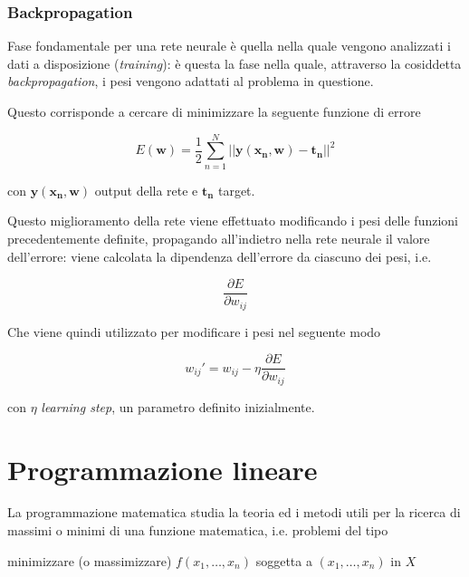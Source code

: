 \subsubsection{Backpropagation} 
\label{section:backprop}

Fase fondamentale per una rete neurale è quella nella quale vengono analizzati i dati a disposizione 
(\textit{training}): è questa la fase nella quale, attraverso la cosiddetta \textit{backpropagation}, 
i pesi vengono adattati al problema in questione.

Questo corrisponde a cercare di minimizzare la seguente funzione di errore \cite{bishop2006pattern}

\begin{equation}
    E(\mathbf{w}) = \frac{1}{2} \sum_{n=1}^{N} || \mathbf{y(x_n, w) - t_n} || ^2
    \label{eq:error_nn}
\end{equation}

con $\mathbf{y(x_n, w)}$ output della rete e $\mathbf{t_n}$ target.

Questo miglioramento della rete viene effettuato modificando i pesi delle funzioni 
precedentemente definite, propagando all'indietro nella rete neurale il valore dell'errore:
viene calcolata la dipendenza dell'errore da ciascuno dei pesi, i.e.

\begin{equation}
    \frac{\partial E}{\partial w_{ij}} 
    \label{eq:err_nn}
\end{equation}

Che viene quindi utilizzato per modificare i pesi nel seguente modo \cite{Mazur2015}

\begin{equation}
    w_{ij}' = w_{ij} - \eta  \frac{\partial E}{\partial w_{ij}}
    \label{eq:back_err}
\end{equation}

\noindent
con $\eta$ \textit{learning step}, un parametro definito inizialmente.

\newpage

\section{Programmazione lineare}
\label{section:lin_programming}

La programmazione matematica studia la teoria ed i metodi utili per la ricerca 
di massimi o minimi di una funzione matematica, i.e. problemi del tipo 
\cite{walsh1985introduction}

\begin{center}
    minimizzare (o massimizzare) $f(x_1, \dots, x_n)$ soggetta a $(x_1, \dots, x_n)$ in $X$    
\end{center}

